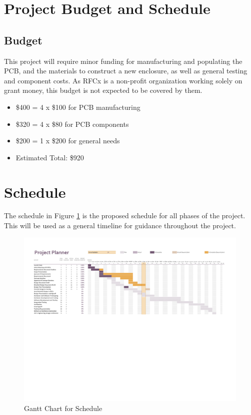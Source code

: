 \documentclass{article}
\numberwithin{figure}{section}
\numberwithin{equation}{section}
\begin{document}
{\section{Project Budget and Schedule} \label{sect:budgetandschedule}
\subsection{Budget} \label{sect:budget}
This project will require minor funding for manufacturing and populating the PCB, and the materials to construct a new enclosure, as well as general testing and component costs. As RFCx is a non-profit organization working solely on grant money, this budget is not expected to be covered by them.
\begin{itemize}
\item \$400 = 4 x \$100 for PCB manufacturing
\item \$320 = 4 x \$80 for PCB components
\item \$200 = 1 x \$200 for general needs
\item Estimated Total: \$920
\end{itemize}

\section{Schedule} \label{sect:schedule}
The schedule in Figure \ref{fig:gantt} is the proposed schedule for all phases of the project. This will be used as a general timeline for guidance throughout the project.

\begin{figure}[H]
  \centering
  \includegraphics[scale=0.65, trim=0cm 12cm 0cm 0cm, clip=true]{Schedule.pdf}
  \caption{Gantt Chart for Schedule}
  \label{fig:gantt}
\end{figure}


}
\end{document}

